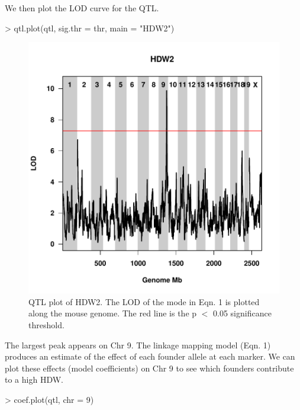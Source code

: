 \documentclass{article}
\begin{document}
We then plot the LOD curve for the QTL.

\begin{Schunk}
\begin{Sinput}
> qtl.plot(qtl, sig.thr = thr, main = "HDW2")
\end{Sinput}
\end{Schunk}

\begin{figure}
\begin{center}
\includegraphics{QTL_Mapping_DO_Mice-fig1}
\end{center}
\caption{QTL plot of HDW2. The LOD of the mode in Eqn. 1 is plotted along the mouse genome. The red line is the p $<$ 0.05 significance threshold.}
\label{fig:qtlplot}
\end{figure}

The largest peak appears on Chr 9. The linkage mapping model (Eqn. 1) produces an estimate of the effect of each founder allele at each marker. We can plot these effects (model coefficients) on Chr 9 to see which founders contribute to a high HDW.

\begin{Schunk}
\begin{Sinput}
> coef.plot(qtl, chr = 9)
\end{Sinput}
\end{Schunk}
\end{document}

